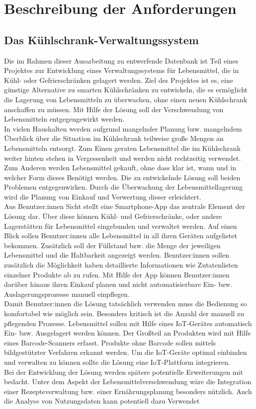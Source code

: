 \chapter{Beschreibung der Anforderungen}\label{ch:Beschreibung der Anforderungen}
\section{Das Kühlschrank-Verwaltungssystem}\label{sec:Das Kühlschrank-Verwaltungssystem}

Die im Rahmen dieser Ausarbeitung zu entwerfende Datenbank ist Teil eines Projektes zur Entwicklung eines Verwaltungssystems für Lebensmittel, die in Kühl- oder Gefrierschränken gelagert werden. Ziel des Projektes ist es, eine günstige Alternative zu smarten Kühlschränken zu entwickeln, die es ermöglicht die Lagerung von Lebensmitteln zu überwachen, ohne einen neuen Kühlschrank anschaffen zu müssen. Mit Hilfe der Lösung soll der Verschwendung von Lebensmitteln entgegengewirkt werden.\\ In vielen Haushalten werden aufgrund mangelnder Planung bzw. mangelndem Überblick über die Situation im Kühlschrank teilweise große Mengen an Lebensmitteln entsorgt. Zum Einen geraten Lebensmittel die im Kühlschrank weiter hinten stehen in Vergessenheit und werden nicht rechtzeitig verwendet. Zum Anderen werden Lebensmittel gekauft, ohne dass klar ist, wann und in welcher Form dieses Benötigt werden. Die zu entwickelnde Lösung soll beiden Problemen entgegenwirken. Durch die Überwachung der Lebensmittellagerung wird die Planung von Einkauf und Verwertung dieser erleichtert.\\ Aus Benutzer:innen Sicht stellt eine Smartphone-App das zentrale Element der Lösung dar. Über diese können Kühl- und Gefrierschränke, oder andere Lagerstätten für Lebensmittel eingebunden und verwaltet werden. Auf einen Blick sollen Benutzer:innen alle Lebensmittel in all ihren Geräten aufgelistet bekommen. Zusätzlich soll der Füllstand bzw. die Menge der jeweiligen Lebensmittel und die Haltbarkeit angezeigt werden. Benutzer:innen sollen zusätzlich die Möglichkeit haben detaillierte Informationen wie Zutatenlisten einzelner Produkte ab zu rufen. Mit Hilfe der App können Benutzer:innen darüber hinaus ihren Einkauf planen und nicht automatisierbare Ein- bzw. Auslagerungsprozesse manuell einpflegen.\\ Damit Benutzer:innen die Lösung tatsächlich verwenden muss die Bedienung so komfortabel wie möglich sein. Besonders kritisch ist die Anzahl der manuell zu pflegenden Prozesse. Lebensmittel sollen mit Hilfe eines IoT-Gerätes automatisch Ein- bzw. Ausgelagert werden können. Der Großteil an Produkten wird mit Hilfe eines Barcode-Scanners erfasst. Produkte ohne Barcode sollen mittels bildgestützter Verfahren erkannt werden. Um die IoT-Geräte optimal einbinden und verwalten zu können sollte die Lösung eine IoT-Plattform integrieren.\\ Bei der Entwicklung der Lösung werden spätere potentielle Erweiterungen mit bedacht. Unter dem Aspekt der Lebensmittelverschwendung wäre die Integration einer Rezepteverwaltung bzw. einer Ernährungsplanung besonders nützlich. Auch die Analyse von Nutzungsdaten kann potentiell dazu Verwendet 